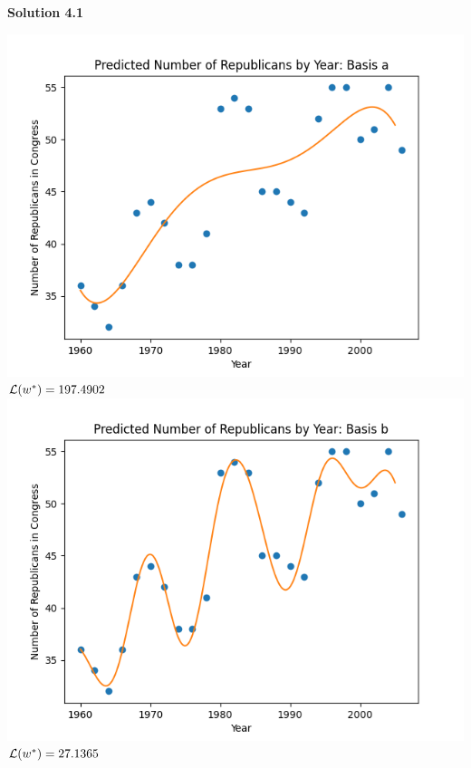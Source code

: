 \documentclass[submit]{harvardml}
\begin{document}
\newpage

\noin \textbf{Solution 4.1}

\includegraphics[scale=0.75]{yeara.png} \\

\textbf{$\mathcal{L}(w^*) = 197.4902$} \\

\includegraphics[scale=0.75]{yearb.png}\\

\textbf{$\mathcal{L}(w^*) = 27.1365$} \\
\end{document}
